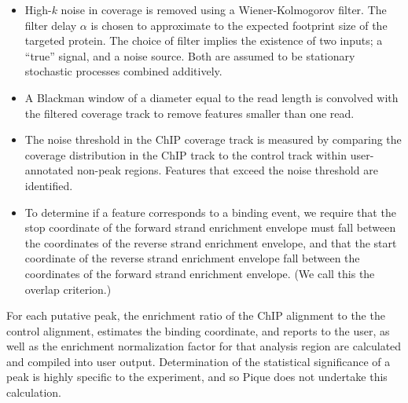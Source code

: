 \documentclass{bioinfo}
\begin{document}
\begin{methods}
\begin{itemize}
\item High-$k$ noise in coverage is removed using a Wiener-Kolmogorov
  filter. The filter delay $\alpha$ is chosen to approximate to the
  expected footprint size of the targeted protein. The choice of
  filter implies the existence of two inputs; a ``true'' signal, and a
  noise source. Both are assumed to be stationary stochastic processes
  combined additively.


\item A Blackman window of a diameter equal to the read length is
  convolved with the filtered coverage track to remove features
  smaller than one read. 

\item The noise threshold in the ChIP coverage track is measured by
  comparing the coverage distribution in the ChIP track to the control
  track within user-annotated non-peak regions. Features that exceed
  the noise threshold are identified.

\item To determine if a feature corresponds to a binding event, we
  require that the stop coordinate of the forward strand enrichment
  envelope must fall between the coordinates of the reverse strand
  enrichment envelope, and that the start coordinate of the reverse
  strand enrichment envelope fall between the coordinates of the
  forward strand enrichment envelope. (We call this the overlap
  criterion.)

\end{itemize}


\noindent For each putative peak, the enrichment ratio of the ChIP
alignment to the the control alignment, estimates the binding
coordinate, and reports to the user, as well as the enrichment
normalization factor for that analysis region are calculated and
compiled into user output.  Determination of the statistical
significance of a peak is highly specific to the experiment, and so
Pique does not undertake this calculation.

\end{methods}
\end{document}
